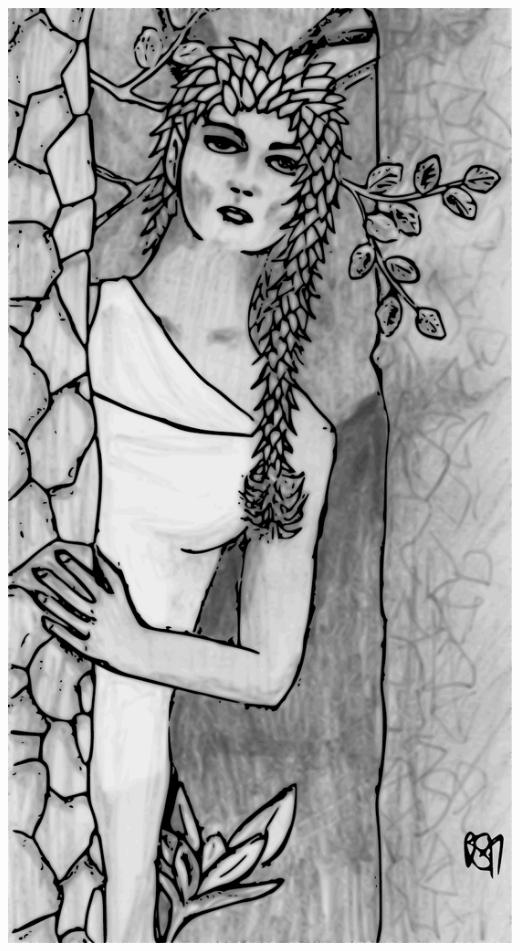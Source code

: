 \begin{multicols}{2}
\noindent\includegraphics[width=\columnwidth]{southerndryad.pdf}\label{southerndryad}


\end{multicols}

